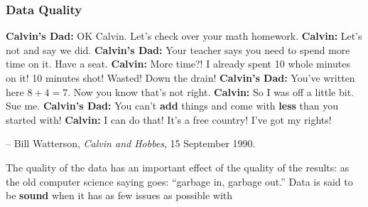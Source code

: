 \subsubsection{Data Quality}
\begin{tcolorbox}[title=The Importance of Validation]
\textbf{Calvin's Dad:} OK Calvin. Let's check over your math homework. \newline
\textbf{Calvin:} Let's not and say we did. \newline
\textbf{Calvin's Dad:} Your teacher says you need to spend more time on it. Have a seat. \newline
\textbf{Calvin:} More time?! I already spent 10 whole minutes on it! 10 minutes shot! Wasted! Down the drain!\newline
\textbf{Calvin's Dad:} You've written here $8+4=7$. Now you know that's not right. \newline
\textbf{Calvin:} So I was off a little bit. Sue me.\newline
\textbf{Calvin's Dad:} You can't \textbf{add} things and come with \textbf{less} than you started with!\newline
\textbf{Calvin:} I can do that! It's a free country! I've got my rights!
\\[-0.6cm]
\begin{flushright}
-- Bill Watterson, \textit{Calvin and Hobbes}, 15 September 1990.
\end{flushright}
\end{tcolorbox}
\noindent
The quality of the data has an important effect of the quality of the results: as the old computer science saying goes: ``garbage in, garbage out.''
\newl Data is said to be \textbf{sound} when it has as few issues as possible with 
